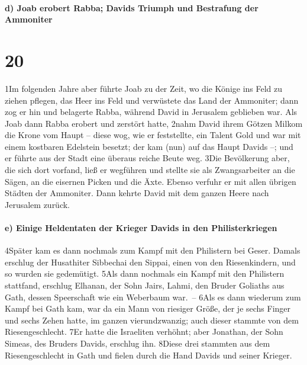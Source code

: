 \hypertarget{d-joab-erobert-rabba-davids-triumph-und-bestrafung-der-ammoniter}{%
\paragraph{d) Joab erobert Rabba; Davids Triumph und Bestrafung der
Ammoniter}\label{d-joab-erobert-rabba-davids-triumph-und-bestrafung-der-ammoniter}}

\hypertarget{section-19}{%
\section{20}\label{section-19}}

1Im folgenden Jahre aber führte Joab zu der Zeit, wo die Könige ins Feld
zu ziehen pflegen, das Heer ins Feld und verwüstete das Land der
Ammoniter; dann zog er hin und belagerte Rabba, während David in
Jerusalem geblieben war. Als Joab dann Rabba erobert und zerstört hatte,
2nahm David ihrem Götzen Milkom die Krone vom Haupt -- diese wog, wie er
feststellte, ein Talent Gold und war mit einem kostbaren Edelstein
besetzt; der kam (nun) auf das Haupt Davids --; und er führte aus der
Stadt eine überaus reiche Beute weg. 3Die Bevölkerung aber, die sich
dort vorfand, ließ er wegführen und stellte sie als Zwangsarbeiter an
die Sägen, an die eisernen Picken und die Äxte. Ebenso verfuhr er mit
allen übrigen Städten der Ammoniter. Dann kehrte David mit dem ganzen
Heere nach Jerusalem zurück.

\hypertarget{e-einige-heldentaten-der-krieger-davids-in-den-philisterkriegen}{%
\paragraph{e) Einige Heldentaten der Krieger Davids in den
Philisterkriegen}\label{e-einige-heldentaten-der-krieger-davids-in-den-philisterkriegen}}

4Später kam es dann nochmals zum Kampf mit den Philistern bei Geser.
Damals erschlug der Husathiter Sibbechai den Sippai, einen von den
Riesenkindern, und so wurden sie gedemütigt. 5Als dann nochmals ein
Kampf mit den Philistern stattfand, erschlug Elhanan, der Sohn Jairs,
Lahmi, den Bruder Goliaths aus Gath, dessen Speerschaft wie ein
Weberbaum war.~-- 6Als es dann wiederum zum Kampf bei Gath kam, war da
ein Mann von riesiger Größe, der je sechs Finger und sechs Zehen hatte,
im ganzen vierundzwanzig; auch dieser stammte von dem Riesengeschlecht.
7Er hatte die Israeliten verhöhnt; aber Jonathan, der Sohn Simeas, des
Bruders Davids, erschlug ihn. 8Diese drei stammten aus dem
Riesengeschlecht in Gath und fielen durch die Hand Davids und seiner
Krieger.

